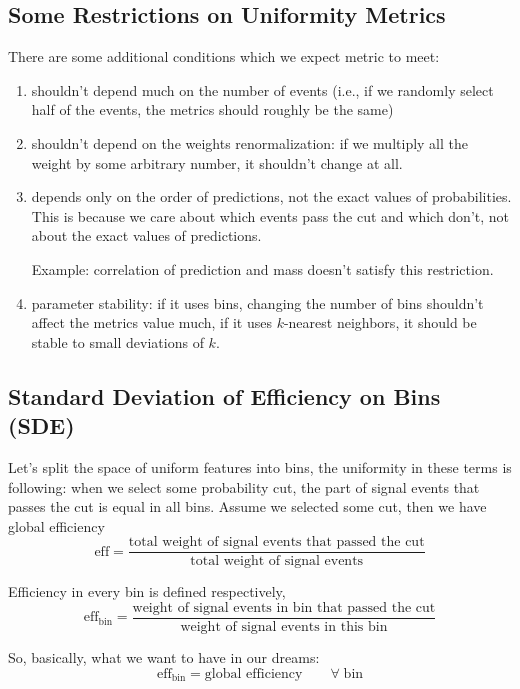 \documentclass{JINST}
\theoremstyle{definition}
\theoremstyle{remark}
\begin{document}
\subsection{Some Restrictions on Uniformity Metrics}

There are some additional conditions which we expect metric to meet:
\begin{enumerate}
\item
shouldn't depend much on the number of events (i.e., if we randomly select half of the events, the metrics should roughly be the same)
\item
shouldn't depend on the weights renormalization: if we multiply all the weight by some arbitrary number, it shouldn't change at all.
\item 
depends only on the order of predictions, not the exact values of probabilities.
This is because we care about which events pass the cut and which don't, not about the exact values of predictions.

Example: correlation of prediction and mass doesn't satisfy this restriction.
\item
parameter stability: if it uses bins, changing the number of bins shouldn't affect the metrics value much, if it uses $k$-nearest neighbors, it should be stable to small deviations of $k$.
\end{enumerate}


\subsection{Standard Deviation of Efficiency on Bins (SDE)}

\def\bineff{\text{eff}_\text{bin}}
\def\binweight{\text{weight}_\text{bin}}
\def\globaleff{\text{eff}}
\def\SDE{\text{SDE}}
\def\bin{\text{bin}}


Let's split the space of uniform features into bins, the uniformity in these terms is following: when we select some probability cut, 
the part of signal events that passes the cut is equal in all bins. Assume we selected some cut, then we have global efficiency
\[
	\globaleff = \dfrac{
		\text{total weight of signal events that passed the cut}}
		{\text{total weight of signal events}}
\]

Efficiency in every bin is defined respectively, 
\[
	\bineff = \dfrac{
		\text{weight of signal events in bin that passed the cut}}
		{\text{weight of signal events in this bin}} 
\]

So, basically, what we want to have in our dreams:
\[
	\bineff = \text{global efficiency} \qquad \forall \; \text{bin}
\]
\end{document}
